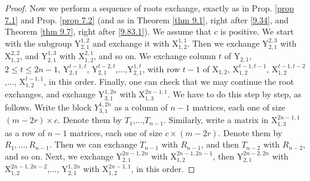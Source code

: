 \documentclass[12pts]{amsart}
\begin{document}
\begin{proof}
 Now we perform a sequence of roots exchange, exactly as in Prop. \ref{prop 7.1} and Prop. \ref{prop 7.2} (and as in Theorem \ref{thm 9.1}, right after \eqref{9.34}, and Theorem \ref{thm 9.7}, right after \eqref{9.83.1}). We assume that $c$ is positive. We start with the subgroup $\mathrm{Y}_{2,1}^{1,2}$ and exchange it with $\mathrm{X}_{1,2}^{1,1}$. Then we exchange $\mathrm{Y}_{2,1}^{2,3}$ with $\mathrm{X}_{1,2}^{2,2}$, and $\mathrm{Y}_{2,1}^{1,3}$ with $\mathrm{X}_{1,2}^{2,1}$, and so on. We exchange column $t$ of $\mathrm{Y}_{2,1}$, $2\leq t\leq 2n-1$, $\mathrm{Y}_{2,1}^{t-1,t}$, $\mathrm{Y}_{2,1}^{t-2,t}$,...,$\mathrm{Y}_{2,1}^{1,t}$, with row $t-1$ of $\mathrm{X}_{1,2}$, $\mathrm{X}_{1,2}^{t-1,t-1}$, $\mathrm{X}_{1,2}^{t-1,t-2}$,..., $\mathrm{X}_{1,2}^{t-1,1}$, in this order. Finally, one can check that we may continue the root exchanges, and exchange $\mathrm{Y}_{3,1}^{1,2n}$ with $\mathrm{X}_{1,3}^{2n-1,1}$. We have to do this step by step, as follows. Write the block $Y_{3,1}^{1,2n}$ as a column of $n-1$ matrices, each one of size $(m-2r)\times c$. Denote them by $T_1$,...,$T_{n-1}$. Similarly, write a matrix in $\mathrm{X}_{1,3}^{2n-1,1}$ as a row of $n-1$ matrices, each one of size $c\times (m-2r)$. Denote them by $R_1,...,R_{n-1}$. Then we can exchange $T_{n-1}$ with $R_{n-1}$, and then $T_{n-2}$ with $R_{n-2}$, and so on. Next, we exchange $\mathrm{Y}_{2,1}^{2n-1,2n}$ with $\mathrm{X}_{1,2}^{2n-1,2n-1}$, then  $\mathrm{Y}_{2,1}^{2n-2,2n}$ with $\mathrm{X}_{1,2}^{2n-1,2n-2}$,..., $\mathrm{Y}_{2,1}^{1,2n}$ with $\mathrm{X}_{1,2}^{2n-1,1}$, in this order. 
 

\end{proof}
\end{document}
